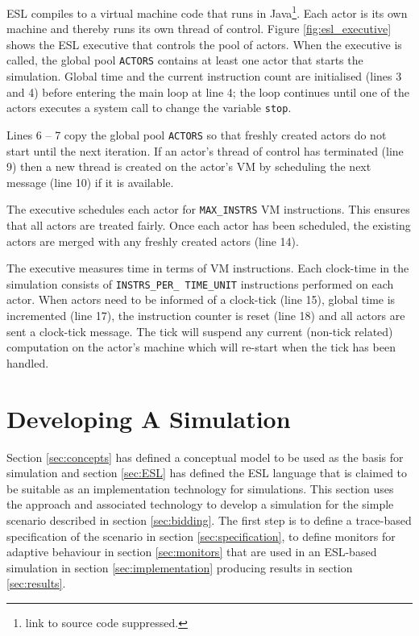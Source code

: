 \documentclass[10pt,numbers]{sigplanconf}
\def\code#1{{\normalfont\lstinline[basicstyle=\small\ttfamily]{#1}}}
\begin{document}
ESL compiles to a virtual machine code that runs in Java\footnote{link to source code suppressed.}. Each actor is its own machine and thereby runs its own thread of control. Figure \ref{fig:esl_executive} shows the ESL executive that controls the pool of actors. When the executive is called, the global pool \code{ACTORS} contains at least one actor that starts the simulation. Global time and the current instruction count are initialised (lines 3 and 4) before entering the main loop at line 4; the loop continues until one of the actors executes a system call to change the variable \code{stop}.

Lines 6 -- 7 copy the global pool \code{ACTORS} so that freshly created actors do not start until the next iteration. If an actor's thread of control has terminated (line 9) then a new thread is created on the actor's VM by scheduling the next message (line 10) if it is available.

The executive schedules each actor for \code{MAX_INSTRS} VM instructions. This ensures that all actors are treated fairly. Once each actor has been scheduled, the existing actors are merged with any freshly created actors (line 14).

The executive measures time in terms of VM instructions. Each clock-time in the simulation consists of \code{INSTRS_PER_ TIME_UNIT} instructions performed on each actor. When actors need to be informed of a clock-tick (line 15), global time is incremented (line 17), the instruction counter is reset (line 18) and all actors are sent a clock-tick message. The tick will suspend any current (non-tick related) computation on the actor's machine which will re-start when the tick has been handled.

\section{Developing A Simulation}

\label{sec:simulation}

Section \ref{sec:concepts} has defined a conceptual model to be used as the basis for simulation and section \ref{sec:ESL} has defined the ESL language that is claimed to be suitable as an implementation technology for simulations. This section uses the approach and associated technology to develop a simulation for the simple scenario described in section \ref{sec:bidding}. The first step is to define a trace-based specification of the scenario in section \ref{sec:specification}, to define monitors for adaptive behaviour in section \ref{sec:monitors} that are used in an ESL-based simulation in section \ref{sec:implementation} producing results in section \ref{sec:results}.
\end{document}
